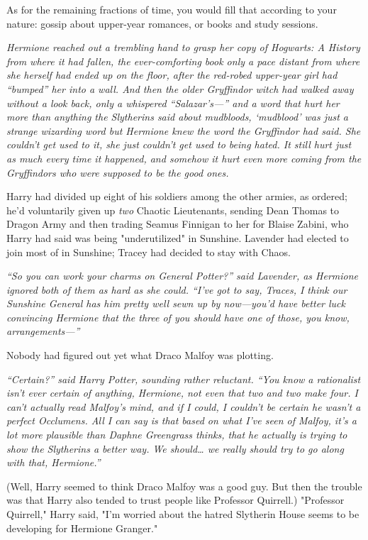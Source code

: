 As for the remaining fractions of time, you would fill that according to your
nature: gossip about upper-year romances, or books and study sessions.

\emph{Hermione reached out a trembling hand to grasp her copy of \emph{Hogwarts: A
History} from where it had fallen, the ever-comforting book only a pace
distant from where she herself had ended up on the floor, after the red-robed
upper-year girl had ``bumped'' her into a wall. And then the older Gryffindor
witch had walked away without a look back, only a whispered \mbox{``Salazar's---''} and
a word that hurt her more than anything the Slytherins said about mudbloods,
`mudblood' was just a strange wizarding word but Hermione knew the word the
Gryffindor had said. She couldn't get used to it, she just couldn't get used to
being hated. It still hurt just as much every time it happened, and somehow it
hurt even more coming from the Gryffindors who were \emph{supposed} to be the
good ones.}

Harry had divided up eight of his soldiers among the other armies, as ordered;
he'd voluntarily given up \emph{two} Chaotic Lieutenants, sending Dean Thomas
to Dragon Army and then trading Seamus Finnigan to her for Blaise Zabini, who
Harry had said was being "underutilized" in Sunshine. Lavender had elected to
join most of \SPHEW in Sunshine; Tracey had decided to stay with Chaos.

\emph{``So you can work your charms on General Potter?'' said Lavender, as
Hermione ignored both of them as hard as she could. ``I've got to say, Traces, I
think our Sunshine General has him pretty well sewn up by now---you'd have
better luck convincing Hermione that the three of you should have one of those,
you know, arrangements---''}

Nobody had figured out yet what Draco Malfoy was plotting.

\emph{``Certain?'' said Harry Potter, sounding rather reluctant. ``You know a
rationalist isn't ever certain of anything, Hermione, not even that two and two
make four. I can't actually read Malfoy's mind, and if I could, I couldn't be
certain he wasn't a perfect Occlumens. All I can say is that based on what I've
seen of Malfoy, it's a lot more plausible than Daphne Greengrass thinks, that
he actually is trying to show the Slytherins a better way. We should{\ldots} we
really should try to go along with that, Hermione.''}

(Well, Harry seemed to think Draco Malfoy was a good guy. But then the trouble
was that Harry also tended to trust people like Professor Quirrell.)
\later
"Professor Quirrell," Harry said, "I'm worried about the hatred Slytherin House
seems to be developing for Hermione Granger."

